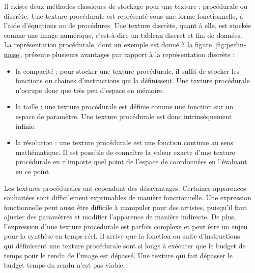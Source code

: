 \bigskip

Il existe deux méthodes classiques de stockage pour une texture : procédurale ou discrète. Une texture procédurale est représenté sous une forme fonctionnelle, à l'aide d'équations ou de procédures. Une texture discrète, quant à elle, est stockée comme une image numérique, c'est-à-dire un tableau discret et fini de données. La représentation procédurale, dont un exemple est donné à la figure~\ref{fig:perlin-noise}, présente plusieurs avantages par rapport à la représentation discrète :

\begin{itemize}
    \item la compacité : pour stocker une texture procédurale, il suffit de stocker les fonctions ou chaines d'instructions qui la définissent. Une texture procédurale n'occupe donc que très peu d'espace en mémoire.
    \item la taille : une texture procédurale est définie comme une fonction sur un espace de paramètre. Une texture procédurale est donc intrinsèquement infinie.
    \item la résolution : une texture procédurale est une fonction continue au sens mathématique. Il est possible de connaître la valeur exacte d'une texture procédurale en n'importe quel point de l'espace de coordonnées en l'évaluant en ce point.
\end{itemize}

Les textures procédurales ont cependant des désavantages. Certaines apparences souhaitées sont difficilement exprimables de manière fonctionnelle. Une expression fonctionnelle peut aussi être difficile à manipuler pour des artistes, puisqu'il faut ajuster des paramètres et modifier l'apparence de manière indirecte. De plus, l'expression d'une texture procédurale est parfois complexe et peut être un enjeu pour la synthèse en temps-réel. Il arrive que la fonction ou suite d'instructions qui définissent une texture procédurale sont si longs à exécuter que le budget de temps pour le rendu de l'image est dépassé. Une texture qui fait dépasser le budget temps du rendu n'est pas viable.

\bigskip

